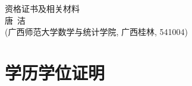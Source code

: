 \documentclass[UFT8]{ctexart}%
\begin{document}
\thispagestyle{empty} %
\vspace*{3cm}
\begin{center}
{{\LARGE\heiti 资格证书及相关材料}\\[0.6cm]
{\normalsize 唐\ 洁}\\[0.1cm]
{\small(广西师范大学数学与统计学院, 广西桂林, 541004)}}
\end{center}

\clearpage%
\tableofcontents%
\thispagestyle{empty} %

\clearpage%
\setcounter{page}{1}%

%
%
%
%
%
%
%
%


%



\section{学历学位证明}








\end{document}
